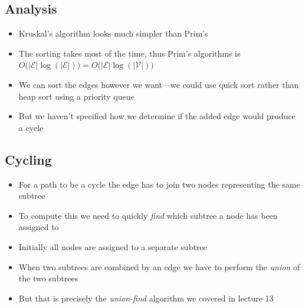 \begin{slide}
\section{Analysis}

\begin{PauseHighLight}
  \begin{itemize}
  \item Kruskal's algorithm looks much simpler than Prim's\pause
  \item The sorting takes most of the time, thus Prim's algorithms is
    $O\bigl(|\mathcal{E}| \log(|\mathcal{E}|)\bigr) = O\bigl(|\mathcal{E}|
    \log(|\mathcal{V}|)\bigr)$\pause
  \item We can sort the edges however we want---we could use quick sort
    rather than heap sort using a priority queue\pause
  \item But we haven't specified how we determine if the added edge
    would produce a cycle\pause
  \end{itemize}
\end{PauseHighLight}

\end{slide}


\begin{slide}
\section[-1]{Cycling}

\begin{PauseHighLight}
  \begin{itemize}
  \item For a path to be a cycle the edge has to join two nodes
    representing the same subtree\pause
  \item To compute this we need to quickly \emph{find} which subtree a
    node has been assigned to\pause
  \item Initially all nodes are assigned to a separate subtree\pause
  \item When two subtrees are combined by an edge we have to perform the
    \emph{union} of the two subtrees\pause
  \item But that is precisely the \emph{union-find} algorithm we
    covered in lecture 13\pause
  \end{itemize}
\end{PauseHighLight}

\end{slide}

